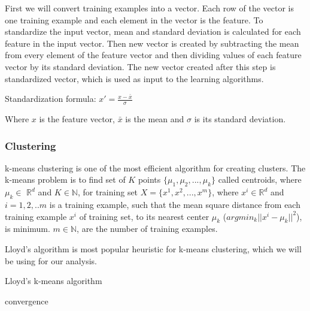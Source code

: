 \documentclass[10pt,oneside,a4paper]{article}
\begin{document}
First we will convert training examples into a vector. Each row of the vector is one training example and each element in the vector is the feature. To standardize the input vector, mean and standard deviation is calculated for each feature in the input vector. Then new vector is created by subtracting the mean from every element of the feature vector and then dividing values of each feature vector by its standard deviation. The new vector created after this step is standardized vector, which is used as input to the learning algorithms.

\hspace{2cm} Standardization formula: $x' = \frac{x - \bar{x}}{\sigma}$

Where $x$ is the feature vector, ${\bar{x}}$ is the mean and $\sigma$  is its standard deviation.

\subsubsection{Clustering}

k-means clustering is one of the most efficient algorithm for creating clusters. The k-means problem is to find set of $K$ points $\{\mu_{1}, \mu_{2}, ..., \mu_{k}\}$ called centroids, where $\mu_{k}\in$ $\mathbb{R}^d$ and $K \in \mathbb{N}$, for training set $X = \{x^{1}, x^{2}, ..., x^{m}\}$, where $x^{i} \in \mathbb{R}^d$
and $i= {1,2, ..m}$ is a training example, such that the mean square distance from each training example $x^{i}$ of training set, to its nearest center $\mu_{k}$ ($argmin_{k} || x^{i} {-} \mu_{k} ||^{2}$), is minimum. $m \in \mathbb{N}$, are the number of training examples.\cite{kmeanClustering}

Lloyd's algorithm is most popular heuristic for k-means clustering, which we will be using for our analysis.

\begin{algorithm}
\caption{Lloyd's k-means algorithm}\label{kmeans}
\begin{algorithmic}
\Repeat
  \EndFor
  \EndFor
\Until convergence
\end{algorithmic}
\end{algorithm}
\end{document}
